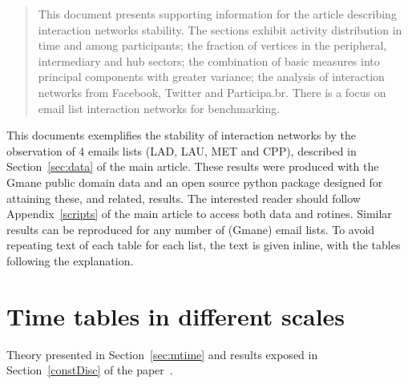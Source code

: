 \documentclass[%
 aip,
 jmp,%
 amsmath,amssymb,
 reprint,%
 floatfix,
]{revtex4-1}
\begin{document}
\date{\today}%

\begin{abstract}
 This document presents supporting information for the article describing interaction networks stability. The sections exhibit activity distribution in time and among participants; the fraction of vertices in the peripheral, intermediary and hub sectors; the combination of basic measures into principal components with greater variance; the analysis of interaction networks from Facebook, Twitter and Participa.br. There is a focus on email list interaction networks for benchmarking.
\end{abstract}

\maketitle

This documents exemplifies the stability of interaction networks by the observation of 4 emails lists (LAD, LAU, MET and CPP), described in Section~\ref{sec:data} of the main article.
These results were produced with the Gmane public domain data and an open source python package designed for attaining
these, and related, results. The interested reader should follow Appendix~\ref{scripts} of the main article to access both data and rotines.
Similar results can be reproduced for any number of (Gmane) email lists.
To avoid repeating text of each table for each list, the text is given inline, with the tables following the explanation.

\section{Time tables in different scales}\label{sec:time}
Theory presented in Section~\ref{sec:mtime} and results exposed in Section~\ref{constDisc} of the paper~\cite{tpaper}.
\end{document}
